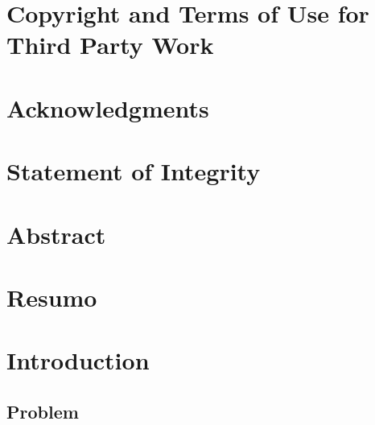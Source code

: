 \documentclass[12pt]{report}
\begin{document}



\setcounter{page}{1}

\chapter*{Copyright and Terms of Use for Third Party Work}

    

\chapter*{Acknowledgments}

    

\chapter*{Statement of Integrity}

    

\chapter*{Abstract}

    
    
\chapter*{Resumo}

    
    
\cleardoublepage
\tableofcontents

\cleardoublepage
{}
\listoffigures
	
\cleardoublepage
{}
\listoftables

\cleardoublepage
\printglossaries
{}

\cleardoublepage
{}
\setcounter{page}{1}
    
\chapter{Introduction}

    

    \section{Problem}
    	
    
\end{document}
